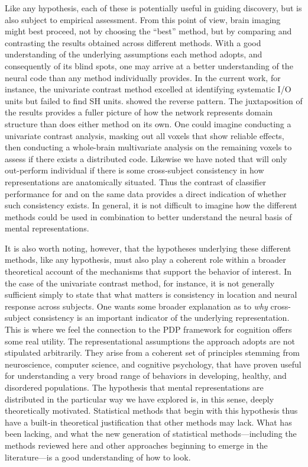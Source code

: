 Like any hypothesis, each of these is potentially useful in guiding discovery, but is also subject to empirical assessment. From this point of view, brain imaging might best proceed, not by choosing the ``best'' method, but by comparing and contrasting the results obtained across different methods. With a good understanding of the underlying assumptions each method adopts, and consequently of its blind spots, one may arrive at a better understanding of the neural code than any method individually provides. In the current work, for instance, the univariate contrast method excelled at identifying systematic I/O units but failed to find SH units. {\soslasso} showed the reverse pattern. The juxtaposition of the results provides a fuller picture of how the network represents domain structure than does either method on its own. One could imagine conducting a univariate contrast analysis, masking out all voxels that show reliable effects, then conducting a whole-brain multivariate analysis on the remaining voxels to assess if there exists a distributed code. Likewise we have noted that {\soslasso} will only out-perform individual {\lasso} if there is some cross-subject consistency in how representations are anatomically situated. Thus the contrast of classifier performance for {\lasso} and {\soslasso} on the same data provides a direct indication of whether such consistency exists. In general, it is not difficult to imagine how the different methods could be used in combination to better understand the neural basis of mental representations.

It is also worth noting, however, that the hypotheses underlying these different methods, like any hypothesis, must also play a coherent role within a broader theoretical account of the mechanisms that support the behavior of interest. In the case of the univariate contrast method, for instance, it is not generally sufficient simply to state that what matters is consistency in location and neural response across subjects. One wants some broader explanation as to {\em why} cross-subject consistency is an important indicator of the underlying representation. This is where we feel the connection to the PDP framework for cognition offers some real utility. The representational assumptions the approach adopts are not stipulated arbitrarily. They arise from a coherent set of principles stemming from neuroscience, computer science, and cognitive psychology, that have proven useful for understanding a very broad range of behaviors in developing, healthy, and disordered populations. The hypothesis that mental representations are distributed in the particular way we have explored is, in this sense, deeply theoretically motivated. Statistical methods that begin with this hypothesis thus have a built-in theoretical justification that other methods may lack. What has been lacking, and what the new generation of statistical methods---including the methods reviewed here and other approaches beginning to emerge in the literature---is a good understanding of how to look.